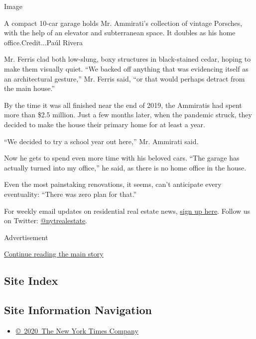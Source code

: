 Image

A compact 10-car garage holds Mr. Ammirati's collection of vintage
Porsches, with the help of an elevator and subterranean space. It
doubles as his home office.Credit...Paúl Rivera

Mr. Ferris clad both low-slung, boxy structures in black-stained cedar,
hoping to make them visually quiet. ``We backed off anything that was
evidencing itself as an architectural gesture,'' Mr. Ferris said, ``or
that would perhaps detract from the main house.''

By the time it was all finished near the end of 2019, the Ammiratis had
spent more than \$2.5 million. Just a few months later, when the
pandemic struck, they decided to make the house their primary home for
at least a year.

``We decided to try a school year out here,'' Mr. Ammirati said.

Now he gets to spend even more time with his beloved cars. ``The garage
has actually turned into my office,'' he said, as there is no home
office in the house.

Even the most painstaking renovations, it seems, can't anticipate every
eventuality: ``There was zero plan for that.''

For weekly email updates on residential real estate news,
\href{http://www.nytimes.com/newsletters/realestate/}{sign up here}.
Follow us on Twitter:
\href{https://twitter.com/nytrealestate}{@nytrealestate}.

Advertisement

\protect\hyperlink{after-bottom}{Continue reading the main story}

\hypertarget{site-index}{%
\subsection{Site Index}\label{site-index}}

\hypertarget{site-information-navigation}{%
\subsection{Site Information
Navigation}\label{site-information-navigation}}

\begin{itemize}
\tightlist
\item
  \href{https://help.nytimes.com/hc/en-us/articles/115014792127-Copyright-notice}{©~2020~The
  New York Times Company}
\end{itemize}

